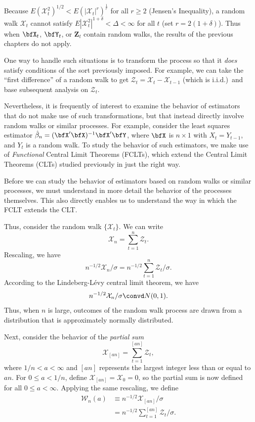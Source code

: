 Because $E(\mathcal{X}_t^2)^{1/2} < E(|\mathcal{X}_t|^r)^{\frac{1}{r}}$ for all $r \geq 2$ (Jensen's Inequality), a random walk $\mathcal{X}_t$ cannot satisfy $E|\mathcal{X}_t^2|^{1+\delta} < \Delta < \infty$ for all $t$ (set $r = 2(1+\delta)$). Thus when $\bfX_t$, $\bfY_t$, or $\mathbf{Z}_t$ contain random walks, the results of the previous chapters do not apply.

One way to handle such situations is to transform the process so that it \emph{does} satisfy conditions of the sort previously imposed. For example, we can take the ``first difference'' of a random walk to get $\mathcal{Z}_t = \mathcal{X}_t - \mathcal{X}_{t-1}$ (which is i.i.d.)\ and base subsequent analysis on $\mathcal{Z}_t$.

Nevertheless, it is frequently of interest to examine the behavior of estimators that do not make use of such transformations, but that instead directly involve random walks or similar processes. For example, consider the least squares estimator $\hat{\beta}_n = (\bfX'\bfX)^{-1} \bfX'\bfY$, where $\bfX$ is $n \times 1$ with $X_t = Y_{t-1}$, and $Y_t$ is a random walk. To study the behavior of such estimators, we make use of \emph{Functional} Central Limit Theorems (FCLTs), which extend the Central Limit Theorems (CLTs) studied previously in just the right way.

Before we can study the behavior of estimators based on random walks or similar processes, we must understand in more detail the behavior of the processes themselves. This also directly enables us to understand the way in which the FCLT extends the CLT.

Thus, consider the random walk $\{\mathcal{X}_t\}$. We can write
\[
\mathcal{X}_n = \sum_{t=1}^{n} \mathcal{Z}_t.
\]
Rescaling, we have
\[
n^{-1/2}\mathcal{X}_n / \sigma = n^{-1/2} \sum_{t=1}^{n} \mathcal{Z}_t / \sigma.
\]
According to the Lindeberg-L\'{e}vy central limit theorem, we have
\[
n^{-1/2}\mathcal{X}_n / \sigma \convd N(0,1).
\]
Thus, when $n$ is large, outcomes of the random walk process are drawn from a distribution that is approximately normally distributed.

Next, consider the behavior of the \emph{partial sum}
\[
\mathcal{X}_{[an]} = \sum_{t=1}^{[an]} \mathcal{Z}_t,
\]
where $1/n < a < \infty$ and $[an]$ represents the largest integer less than or equal to $an$. For $0 \leq a < 1/n$, define $\mathcal{X}_{[an]} = \mathcal{X}_0 = 0$, so the partial sum is now defined for all $0 \leq a < \infty$. Applying the same rescaling, we define
\begin{align*}
\mathcal{W}_n(a) &\equiv n^{-1/2}\mathcal{X}_{[an]}/\sigma \\
&= n^{-1/2}\sum_{t=1}^{[an]} \mathcal{Z}_t / \sigma.
\end{align*}

